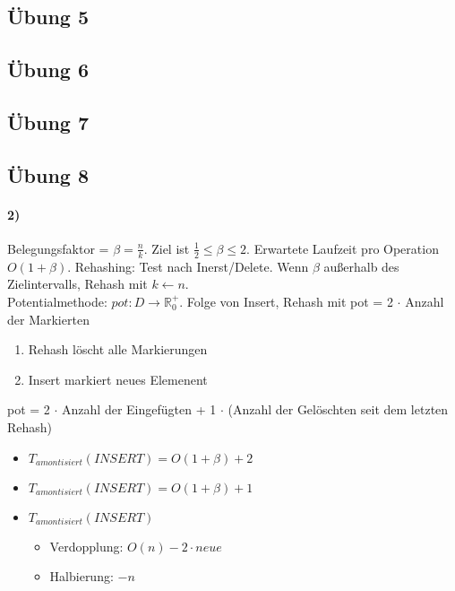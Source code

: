\subsection{Übung 5}

\subsection{Übung 6}

\subsection{Übung 7}


\subsection{Übung 8}
\paragraph{2)} Belegungsfaktor = $ \beta = \frac{n}{k} $. Ziel ist $ \frac{1}{2} \leq \beta \leq 2 $. Erwartete Laufzeit pro Operation $ O(1 + \beta) $. Rehashing: Test nach Inerst/Delete. Wenn $ \beta $ außerhalb des Zielintervalls, Rehash mit $ k \gets n $. \\
Potentialmethode: $ pot: D \rightarrow \mathbb{R}^+_0 $. Folge von Insert, Rehash mit pot = 2 $ \cdot $ Anzahl der Markierten
\begin{enumerate}
    \item Rehash löscht alle Markierungen
    \item Insert markiert neues Elemenent
\end{enumerate} 
pot = 2 $ \cdot $ Anzahl der Eingefügten + 1 $ \cdot $ (Anzahl der Gelöschten seit dem letzten Rehash) \\

\begin{itemize}
    \item $ T_{amontisiert} (INSERT) = O(1+\beta) + 2$  
    \item $ T_{amontisiert} (INSERT) = O(1+\beta) + 1$
    \item $ T_{amontisiert} (INSERT)$
    \begin{itemize}
        \item Verdopplung: $O(n) - 2\cdot neue$
        \item Halbierung: $-n$
    \end{itemize}
\end{itemize}

